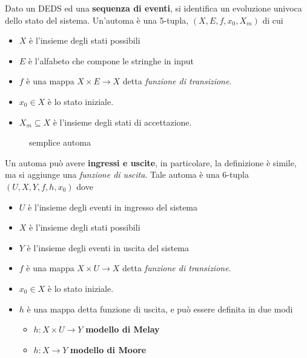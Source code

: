 \documentclass[10pt, letterpaper]{report}
\begin{document}
Dato un DEDS ed una \textbf{sequenza di eventi}, si identifica un evoluzione univoca dello stato del sistema.\acc 
{}  Un'automa è una 
5-tupla, $(X,E,f,x_0, X_m)$ di cui\begin{itemize}
    \item $X$ è l'insieme degli stati possibili 
    \item $E$ è l'alfabeto che compone le stringhe in input 
    \item $f$ è una mappa $X\times E \rightarrow X$ detta 
    \textit{funzione di transizione}. 
    \item $x_0\in X$ è lo stato iniziale. 
    \item $X_m\subseteq X$ è l'insieme degli stati di accettazione.
\end{itemize}
\begin{figure}[h!]
    \centering
        \caption{semplice automa}
        \label{fig:automaSemplice}
\end{figure}
Un automa può avere \textbf{ingressi e uscite}, in particolare, la definizione è simile, ma si aggiunge una \textit{funzione di uscita}. Tale automa è una 6-tupla $(U,X,Y,f,h,x_0)$ dove\begin{itemize}
    \item $U$ è l'insieme degli eventi in ingresso del sistema
    \item $X$ è l'insieme degli stati possibili 
    \item $Y$ è l'insieme degli eventi in uscita  del sistema
    \item $f$ è una mappa $X\times U \rightarrow X$ detta 
    \textit{funzione di transizione}. 
    \item $x_0\in X$ è lo stato iniziale. 
    \item $h$ è una mappa detta funzione di uscita, e può essere definita in due modi \begin{itemize}
        \item $h:X\times U \rightarrow Y$ \textbf{modello di Melay}
        \item $h:X \rightarrow Y$ \textbf{modello di Moore}
    \end{itemize}
\end{itemize}
\end{document}
